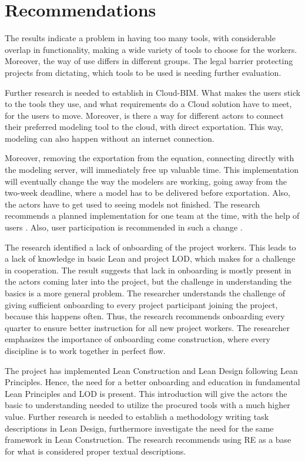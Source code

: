\section{Recommendations}
The results indicate a problem in having too many tools, with considerable overlap in functionality, making a wide variety of tools to choose for the workers. Moreover, the way of use differs in different groups. The legal barrier protecting projects from dictating, which tools to be used is needing further evaluation. 

Further research is needed to establish in Cloud-BIM. What makes the users stick to the tools they use, and what requirements do a Cloud solution have to meet, for the users to move. Moreover, is there a way for different actors to connect their preferred modeling tool to the cloud, with direct exportation. This way, modeling can also happen without an internet connection.  

Moreover, removing the exportation from the equation, connecting directly with the modeling server, will immediately free up valuable time. This implementation will eventually change the way the modelers are working, going away from the two-week deadline, where a model has to be delivered before exportation. Also, the actors have to get used to seeing models not finished. The research recommends a planned implementation for one team at the time, with the help of users \cite{bratteteig2016unpacking}. Also, user participation is recommended in such a change \cite{hatling1998social, ehn1993scandinavian}.

The research identified a lack of onboarding of the project workers. This leads to a lack of knowledge in basic Lean and project LOD, which makes for a challenge in cooperation. The result suggests that lack in onboarding is mostly present in the actors coming later into the project, but the challenge in understanding the basics is a more general problem. The researcher understands the challenge of giving sufficient onboarding to every project participant joining the project, because this happens often. Thus, the research recommends onboarding every quarter to ensure better instruction for all new project workers. The researcher emphasizes the importance of onboarding come construction, where every discipline is to work together in perfect flow.

The project has implemented Lean Construction and Lean Design following Lean Principles. Hence, the need for a better onboarding and education in fundamental Lean Principles and LOD is present. This introduction will give the actors the basic to understanding needed to utilize the procured tools with a much higher value. Further research is needed to establish a methodology writing task descriptions in Lean Design, furthermore investigate the need for the same framework in Lean Construction. The research recommends using RE as a base for what is considered proper textual descriptions. 

\cleardoublepage
